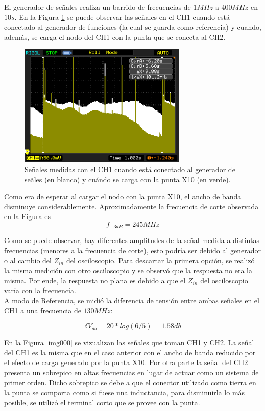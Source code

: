 \documentclass[a4paper,10pt]{article}
\begin{document}
		\indent El generador de se\~nales realiza un barrido de frecuencias de
		$1MHz$ a $400MHz$ en $10s$. En la Figura \ref{img001} se puede 
		observar las se\~nales en el CH1 cuando est\'a conectado al 
		generador de funciones (la cual se guarda como referencia) y cuando, 
		adem\'as, se carga el nodo del CH1 con la punta que se conecta al CH2.
		
		\begin{figure}[!htb]
			\centering
			\includegraphics[width=8cm]
			{Imagenes/Mediciones instrumentos/NewFile1.png}
			\caption{Se\~nales medidas con el CH1 cuando est\'a conectado al 
			generador de se\~ales (en blanco) y cu\'ando se carga con la punta
			X10 (en verde).} \label{img001}
		\end{figure}
			
		\indent Como era de esperar al cargar el nodo con la punta X10, el 
		ancho de banda disminuye considerablemente. Aproximadamente la 
		frecuencia de corte observada en la Figura es $$f_{-3dB}=245MHz$$

		\indent Como se puede observar, hay diferentes amplitudes de la señal
		medida a distintas frecuencias (menores a la frecuencia de corte), 
		esto podría ser debido al generador o al cambio del $Z_{in}$ del 
		osciloscopio. Para descartar la primera opción, se realizó la misma
		medición con otro osciloscopio y se observó que la respuesta no era la
		misma. Por ende, la respuesta no plana es debido a que el $Z_{in}$ del
		osciloscopio varía con la frecuencia.\\
		\indent A modo de Referencia, se midió la diferencia de tensión entre
		ambas señales en el CH1 a una frecuencia de $130MHz$:

		\begin{equation*}
			\delta V_{db} = 20*log(6/5) = 1.58 db 
		\end{equation*}

		\indent En la Figura \ref{img000} se vizualizan las se\~nales que 
		toman CH1 y CH2. La se\~nal del CH1 es la misma que en el caso 
		anterior con el ancho de banda reducido por el efecto de carga 
		generado por la punta X10. Por otra parte la se\~nal del CH2 presenta
		un sobrepico en altas frecuencias en lugar de actuar como un sistema 
		de primer orden. Dicho sobrepico se debe a que el conector utilizado 
		como tierra en la punta se comporta como si fuese una inductancia, 
		para disminuirla lo más posible, se utilizó el terminal corto que
		se provee con la punta. \\
		
\end{document}
